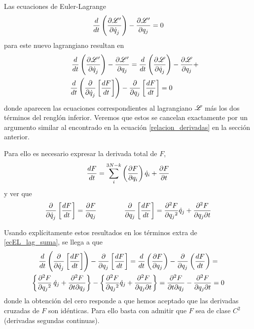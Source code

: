\documentclass[10pt,oneside]{CBFT_book}
\begin{document}
Las ecuaciones de Euler-Lagrange 
\[
	\frac{d}{dt}\left(\dpar{\Lag'}{\dot{q}_j}\right) - \dpar{\Lag'}{q_j} = 0
\]
para este nuevo lagrangiano resultan en
\begin{multline}
 	\qquad \frac{d}{dt}\left(\dpar{\Lag'}{\dot{q}_j}\right) - \dpar{\Lag'}{q_j} =
 	\dtot{}{t}\left(\dpar{\Lag}{\dot{q}_j}\right) - \dpar{\Lag}{q_j} + \\
 	\dtot{}{t}\left(\dpar{}{\dot{q}_j}\left[ \dtot{F}{t} \right]\right) 
	- \dpar{}{q_j}\left[ \dtot{F}{t}\right] = 0 \qquad \label{ecEL_lag_suma}	
\end{multline}
donde aparecen las ecuaciones correspondientes al lagrangiano $\Lag$ más los dos términos del 
renglón inferior.
Veremos que estos se cancelan exactamente por un argumento similar al encontrado en la ecuación
\eqref{relacion_derivadas} en la sección anterior.

Para ello es necesario expresar la derivada total de $F$,
\[
	\dtot{F}{t} = \sum_i^{3N-k} \left( \dpar{F}{q_i} \right) \dot{q}_i + \dpar{F}{t}
\]
y ver que
\[
	\dpar{}{\dot{q}_j}\left[ \dtot{F}{t}\right] = \dpar{F}{q_j} \qquad\qquad
	\dpar{}{q_j}\left[ \dtot{F}{t}\right] = \dpar[2]{F}{q_j} \dot{q}_j + \dparcru{F}{t}{q_j} 
\]

Usando explícitamente estos resultados en los términos extra de \eqref{ecEL_lag_suma}, se llega 
a que 
\begin{multline*}
 	\dtot{}{t}\left(\dpar{}{\dot{q}_j}\left[ \dtot{F}{t} \right]\right) 
	- \dpar{}{q_j}\left[ \dtot{F}{t}\right] =
	\dtot{}{t}\left( \dpar{F}{q_j} \right) - \dpar{}{q_j}\left( \dtot{F}{t}\right) = \\
	\left\{ \dpar[2]{F}{q_j} \: \dot{q}_j + \dparcru{F}{q_j}{t} \right\}%
	- \left\{ \dpar[2]{F}{q_j} \dot{q}_j + \dparcru{F}{t}{q_j} \right\} =
	\dparcru{F}{q_j}{t} - \dparcru{F}{t}{q_j} = 0
\end{multline*}
donde la obtención del cero responde a que hemos aceptado que las derivadas cruzadas de $F$ son idénticas.
Para ello basta con admitir que $F$ sea de clase $C^2$ (derivadas segundas continuas).
\end{document}
